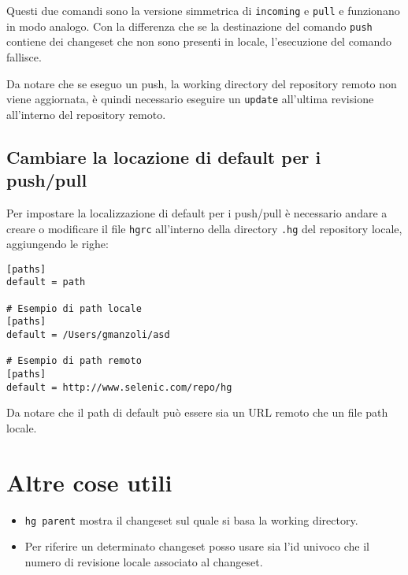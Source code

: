 Questi due comandi sono la versione simmetrica di \texttt{incoming} e \texttt{pull} e funzionano in modo analogo.
Con la differenza che se la destinazione del comando \texttt{push} contiene dei changeset che non sono presenti in locale, l'esecuzione del comando fallisce.

Da notare che se eseguo un push, la working directory del repository remoto non viene aggiornata, è quindi necessario eseguire un \texttt{update} all'ultima revisione all'interno del repository remoto.

\subsection{Cambiare la locazione di default per i push/pull}

Per impostare la localizzazione di default per i push/pull è necessario andare a creare o modificare il file \texttt{hgrc} all'interno della directory \texttt{.hg} del repository locale, aggiungendo le righe:

\begin{lstlisting}
[paths]
default = path

# Esempio di path locale
[paths]
default = /Users/gmanzoli/asd

# Esempio di path remoto
[paths]
default = http://www.selenic.com/repo/hg

\end{lstlisting}

Da notare che il path di default può essere sia un URL remoto che un file path locale.

\section{Altre cose utili}

\begin{itemize}
	\item \texttt{hg parent} mostra il changeset sul quale si basa la working directory.
	\item Per riferire un determinato changeset posso usare sia l'id univoco che il numero di revisione locale associato al changeset.
\end{itemize}